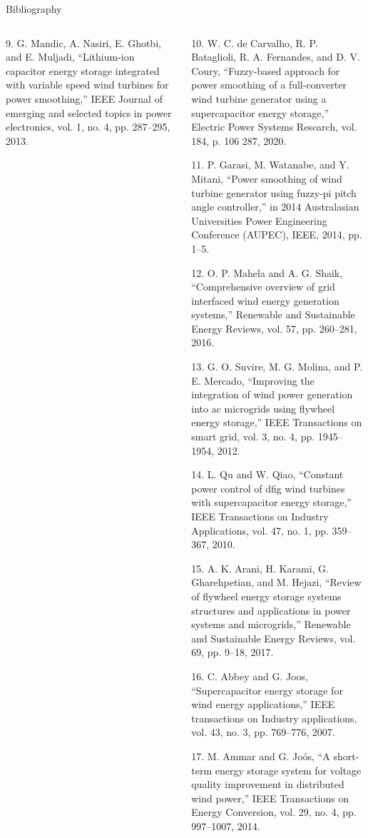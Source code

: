 \begin{frame}{Bibliography}
\begin{columns}
\begin{column}{0.5\textwidth}
{  9. G. Mandic, A. Nasiri, E. Ghotbi, and E. Muljadi, “Lithium-ion capacitor energy storage integrated with variable speed wind turbines for power smoothing,” IEEE Journal of emerging and selected topics in power electronics, vol. 1, no. 4, pp. 287–295, 2013.
  \vspace{0.1cm}
}
\end{column}

\begin{column}{0.5\textwidth}
  \parbox{1\textwidth}{
  10. W. C. de Carvalho, R. P. Bataglioli, R. A. Fernandes, and D. V. Coury, “Fuzzy-based approach for power smoothing of a full-converter wind turbine generator using a supercapacitor energy storage,” Electric Power Systems Research, vol. 184, p. 106 287, 2020.
  \vspace{0.1cm}

  11. P. Garasi, M. Watanabe, and Y. Mitani, “Power smoothing of wind turbine generator using fuzzy-pi pitch angle controller,” in 2014 Australasian Universities Power Engineering Conference (AUPEC), IEEE, 2014, pp. 1–5.
  \vspace{0.1cm}

  12. O. P. Mahela and A. G. Shaik, “Comprehensive overview of grid interfaced wind energy generation systems,” Renewable and Sustainable Energy Reviews, vol. 57, pp. 260–281, 2016.
  \vspace{0.1cm}

  13. G. O. Suvire, M. G. Molina, and P. E. Mercado, “Improving the integration of wind power generation into ac microgrids using flywheel energy storage,” IEEE Transactions on smart grid, vol. 3, no. 4, pp. 1945–1954, 2012.
  \vspace{0.1cm}

  14. L. Qu and W. Qiao, “Constant power control of dfig wind turbines with supercapacitor energy storage,” IEEE Transactions on Industry Applications, vol. 47, no. 1, pp. 359–367, 2010.
  \vspace{0.1cm}

  15. A. K. Arani, H. Karami, G. Gharehpetian, and M. Hejazi, “Review of flywheel energy storage systems structures and applications in power systems and microgrids,” Renewable and Sustainable Energy Reviews, vol. 69, pp. 9–18, 2017.
  \vspace{0.1cm}

  16. C. Abbey and G. Joos, “Supercapacitor energy storage for wind energy applications,” IEEE transactions on Industry applications, vol. 43, no. 3, pp. 769–776, 2007.
  \vspace{0.1cm}

  17. M. Ammar and G. Joós, “A short-term energy storage system for voltage quality improvement in distributed wind power,” IEEE Transactions on Energy Conversion, vol. 29, no. 4, pp. 997–1007, 2014.
  \vspace{0.45cm}
}

\end{column}
\end{columns}

\end{frame}

